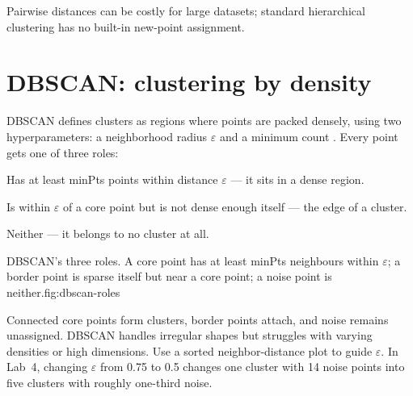 Pairwise distances can be costly for large datasets; standard hierarchical clustering has no built-in new-point assignment.

\section{DBSCAN: clustering by density}
\label{sec:dbscan}

DBSCAN defines clusters as regions where points are packed densely, using two hyperparameters: a neighborhood radius $\varepsilon$ and a minimum count . Every point gets one of three roles:

\begin{description}[leftmargin=1.05in,style=nextline]
  \item[Core point] Has at least minPts points within distance $\varepsilon$ --- it sits in a dense region.
  \item[Border point] Is within $\varepsilon$ of a core point but is not dense enough itself --- the edge of a cluster.
  \item[Noise point] Neither --- it belongs to no cluster at all.
\end{description}

\begin{utpfig}{DBSCAN's three roles. A core point has at least minPts neighbours within $\varepsilon$; a border point is sparse itself but near a core point; a noise point is neither.}{fig:dbscan-roles}
\end{utpfig}

Connected core points form clusters, border points attach, and noise remains unassigned. DBSCAN handles irregular shapes but struggles with varying densities or high dimensions. Use a sorted neighbor-distance plot to guide $\varepsilon$. In Lab~4, changing $\varepsilon$ from 0.75 to 0.5 changes one cluster with 14 noise points into five clusters with roughly one-third noise.

